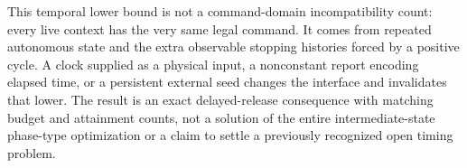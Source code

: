 This temporal lower bound is not a command-domain incompatibility count: every live context has the very same legal command. It comes from repeated autonomous state and the extra observable stopping histories forced by a positive cycle. A clock supplied as a physical input, a nonconstant report encoding elapsed time, or a persistent external seed changes the interface and invalidates that lower. The result is an exact delayed-release consequence with matching budget and attainment counts, not a solution of the entire intermediate-state phase-type optimization or a claim to settle a previously recognized open timing problem.
